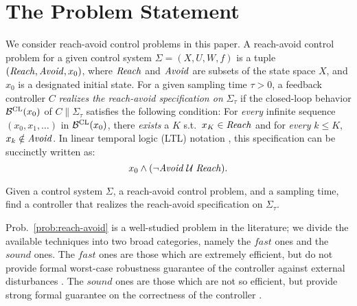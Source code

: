 
\section{The Problem Statement}

We consider reach-avoid control problems in this paper.
A reach-avoid control problem for a given control system $\Sigma=(X,U,W,f)$ is a tuple $(\mathit{Reach},\mathit{Avoid},x_0)$, where $\mathit{Reach}$ and $\mathit{Avoid}$ are subsets of the state space $X$, and $x_0$ is a designated initial state.
For a given sampling time $\tau>0$, a feedback controller $C$ \emph{realizes the reach-avoid specification on} $\Sigma_\tau$ if the closed-loop behavior $\mathcal{B}^{\mathrm{CL}}(x_0)$ of $C\parallel\Sigma_\tau$ satisfies the following condition: For \emph{every} infinite sequence $(x_0,x_1,\ldots)$ in $\mathcal{B}^{\mathrm{CL}}(x_0)$, there \emph{exists} a $K$ s.t.\ $x_K\in \mathit{Reach}$ and for \emph{every} $k\leq K$, $x_k\notin \mathit{Avoid}$. 
In linear temporal logic (LTL) notation \cite{Baier book}, this specification can be succinctly written as:
\begin{equation}\label{eq:spec}
	x_0 \wedge (\lnot \mathit{Avoid}\; \mathcal{U}\;\mathit{Reach}).
\end{equation}

\begin{problem}\label{prob:reach-avoid}
	Given a control system $\Sigma$, a reach-avoid control problem, and a sampling time, find a controller that realizes the reach-avoid specification on $\Sigma_\tau$.
\end{problem}

Prob.~\ref{prob:reach-avoid} is a well-studied problem in the literature; we divide the available techniques into two broad categories, namely the $\mathit{fast}$ ones and the $\mathit{sound}$ ones.
The $\mathit{fast}$ ones are those which are extremely efficient, but do not provide formal worst-case robustness guarantee of the controller against external disturbances \cite{Altro, AI and path planning methods}.
The $\mathit{sound}$ ones are those which are not so efficient, but provide strong formal guarantee on the correctness of the controller \cite{ABCD, Hamilton-Jacobi, LQR tree}.

